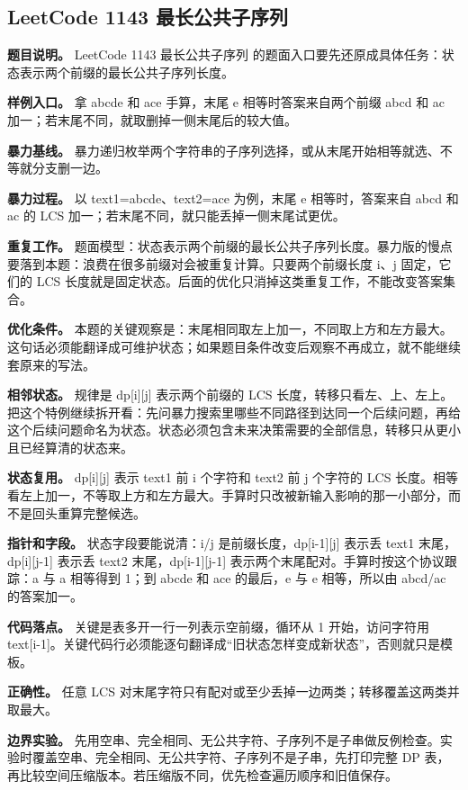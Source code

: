 \subsection{LeetCode 1143 最长公共子序列}

\textbf{题目说明。} LeetCode 1143 最长公共子序列 的题面入口要先还原成具体任务：状态表示两个前缀的最长公共子序列长度。

\textbf{样例入口。} 拿 abcde 和 ace 手算，末尾 e 相等时答案来自两个前缀 abcd 和 ac 加一；若末尾不同，就取删掉一侧末尾后的较大值。

\textbf{暴力基线。} 暴力递归枚举两个字符串的子序列选择，或从末尾开始相等就选、不等就分支删一边。

\textbf{暴力过程。} 以 text1=abcde、text2=ace 为例，末尾 e 相等时，答案来自 abcd 和 ac 的 LCS 加一；若末尾不同，就只能丢掉一侧末尾试更优。

\textbf{重复工作。} 题面模型：状态表示两个前缀的最长公共子序列长度。暴力版的慢点要落到本题：浪费在很多前缀对会被重复计算。只要两个前缀长度 i、j 固定，它们的 LCS 长度就是固定状态。后面的优化只消掉这类重复工作，不能改变答案集合。

\textbf{优化条件。} 本题的关键观察是：末尾相同取左上加一，不同取上方和左方最大。这句话必须能翻译成可维护状态；如果题目条件改变后观察不再成立，就不能继续套原来的写法。

\textbf{相邻状态。} 规律是 dp[i][j] 表示两个前缀的 LCS 长度，转移只看左、上、左上。把这个特例继续拆开看：先问暴力搜索里哪些不同路径到达同一个后续问题，再给这个后续问题命名为状态。状态必须包含未来决策需要的全部信息，转移只从更小且已经算清的状态来。

\textbf{状态复用。} dp[i][j] 表示 text1 前 i 个字符和 text2 前 j 个字符的 LCS 长度。相等看左上加一，不等取上方和左方最大。手算时只改被新输入影响的那一小部分，而不是回头重算完整候选。

\textbf{指针和字段。} 状态字段要能说清：i/j 是前缀长度，dp[i-1][j] 表示丢 text1 末尾，dp[i][j-1] 表示丢 text2 末尾，dp[i-1][j-1] 表示两个末尾配对。手算时按这个协议跟踪：a 与 a 相等得到 1；到 abcde 和 ace 的最后，e 与 e 相等，所以由 abcd/ac 的答案加一。

\textbf{代码落点。} 关键是表多开一行一列表示空前缀，循环从 1 开始，访问字符用 text[i-1]。关键代码行必须能逐句翻译成“旧状态怎样变成新状态”，否则就只是模板。

\textbf{正确性。} 任意 LCS 对末尾字符只有配对或至少丢掉一边两类；转移覆盖这两类并取最大。

\textbf{边界实验。} 先用空串、完全相同、无公共字符、子序列不是子串做反例检查。实验时覆盖空串、完全相同、无公共字符、子序列不是子串，先打印完整 DP 表，再比较空间压缩版本。若压缩版不同，优先检查遍历顺序和旧值保存。

